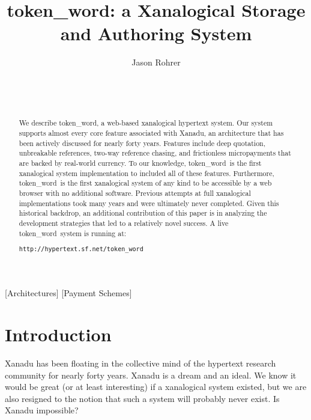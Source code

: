 \documentclass{acm_proc_article-sp}
\newcommand{\tw}{token\_word}
\begin{document}
\title{\tw:  a Xanalogical Storage and Authoring System}


\author{
\alignauthor Jason Rohrer\\
    \\
    \\
    \\
}

\maketitle



\begin{abstract}
We describe \tw, a web-based xanalogical hypertext system.  
Our system supports almost every core feature associated with Xanadu, an architecture that has been actively discussed for nearly forty years.
Features include deep quotation, unbreakable references, two-way reference chasing, and frictionless micropayments that are backed by real-world currency.
To our knowledge, \tw \ is the first xanalogical system implementation to included all of these features.  Furthermore, \tw \  is the first xanalogical system of any kind to be accessible by a web browser with no additional software.
Previous attempts at full xanalogical implementations took many years and were ultimately never completed.
Given this historical backdrop, an additional contribution of this paper is in analyzing the development strategies that led to a relatively novel success.
A live \tw \  system is running at:

\centering\texttt{http://hypertext.sf.net/token\_word}

\end{abstract}

[Architectures]
[Payment Schemes]




\section{Introduction}
\label{sec:Introduction}
Xanadu has been floating in the collective mind of the hypertext research community for nearly forty years.
Xanadu is a dream and an ideal.  
We know it would be great (or at least interesting) if a xanalogical system existed, but we are also resigned to the notion that such a system will probably never exist.
Is Xanadu impossible?
\end{document}
